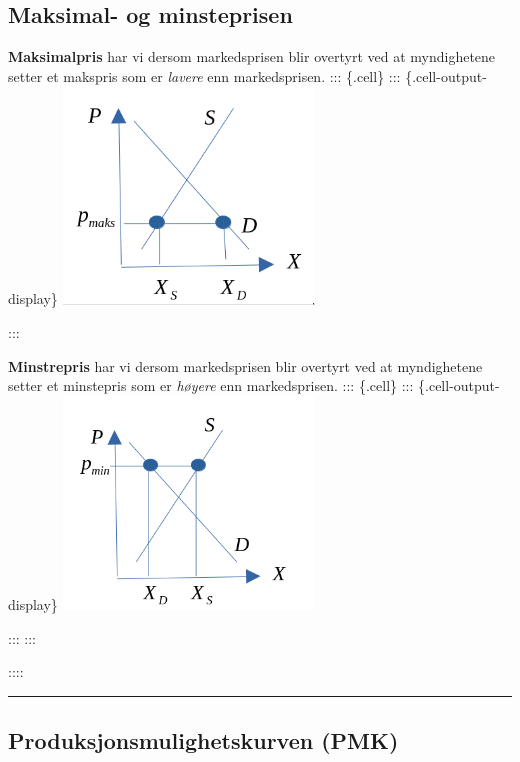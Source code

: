 \documentclass[
  letterpaper,
  DIV=11,
  numbers=noendperiod]{scrartcl}
\begin{document}
\subsection{Maksimal- og minsteprisen}\label{maksimal--og-minsteprisen}

\textbf{Maksimalpris} har vi dersom markedsprisen blir overtyrt ved at
myndighetene setter et makspris som er \emph{lavere} enn markedsprisen.
::: \{.cell\} ::: \{.cell-output-display\}
\includegraphics[width=0.5\textwidth,height=\textheight]{drawio/telikevekt_max.png}

:::

\textbf{Minstrepris} har vi dersom markedsprisen blir overtyrt ved at
myndighetene setter et minstepris som er \emph{høyere} enn
markedsprisen. ::: \{.cell\} ::: \{.cell-output-display\}
\includegraphics[width=0.5\textwidth,height=\textheight]{drawio/telikevekt_min.png}

::: :::

::::

\begin{center}\rule{0.5\linewidth}{0.5pt}\end{center}

\subsection{Produksjonsmulighetskurven
(PMK)}\label{produksjonsmulighetskurven-pmk}
\end{document}
